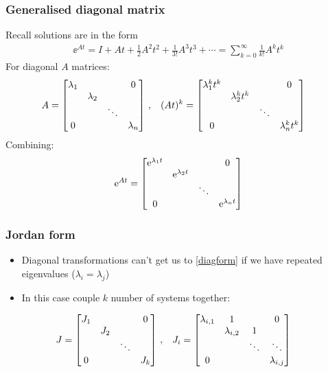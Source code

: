 \documentclass[10pt]{beamer-control}
\begin{document}
\begin{frame}
  \frametitle{Generalised diagonal matrix}
  Recall solutions are in the form
  \begin{align}
    \ee^{At} = I + At + \tfrac12 A^2t^2 + \tfrac{1}{3!}A^3t^3 + \cdots = \sum_{k=0}^{\infty} \tfrac{1}{k!}A^kt^k
  \end{align}
  For diagonal $A$ matrices:
  \begin{align}
    A &= \begin{bmatrix} \lambda_1 &  &  & 0 \\  & \lambda_2 &  &  \\  &  & \ddots &  \\ 0 &  &  & \lambda_n \end{bmatrix} \,, &
    (At)^k &= \begin{bmatrix} \lambda_1^kt^k &  &  & 0 \\  & \lambda_2^kt^k &  &  \\  &  & \ddots &  \\ 0 &  &  & \lambda_n^kt^k \end{bmatrix}
  \end{align}
  Combining:
  \begin{align}\label{eq:diagform}
    \mathrm{e}^{At} = \begin{bmatrix} \mathrm{e}^{\lambda_1 t} &  &  & 0 \\  & \mathrm{e}^{\lambda_2 t} &  &  \\  &  & \ddots &  \\ 0 &  &  & \mathrm{e}^{\lambda_n t} \end{bmatrix}
  \end{align}

\end{frame}

\begin{frame}
  \frametitle{Jordan form}
  \begin{itemize}
    \item Diagonal transformations can't get us to \eqref{diagform} if we have repeated eigenvalues ($\lambda_i=\lambda_j$)
    \item In this case couple $k$ number of systems together:
  \end{itemize}
  \begin{align}
    J   &= \begin{bmatrix} J_1 &  &  & 0 \\  & J_2 &  &  \\  &  & \ddots &  \\ 0 &  &  & J_k \end{bmatrix} \,, &
    J_i &= \begin{bmatrix} \lambda_{i,1} & 1 &  & 0 \\  & \lambda_{i,2} & 1 &  \\  &  & \ddots &  \ddots \\ 0 &  &  & \lambda_{i,j} \end{bmatrix}
  \end{align}
\end{frame}
\end{document}
